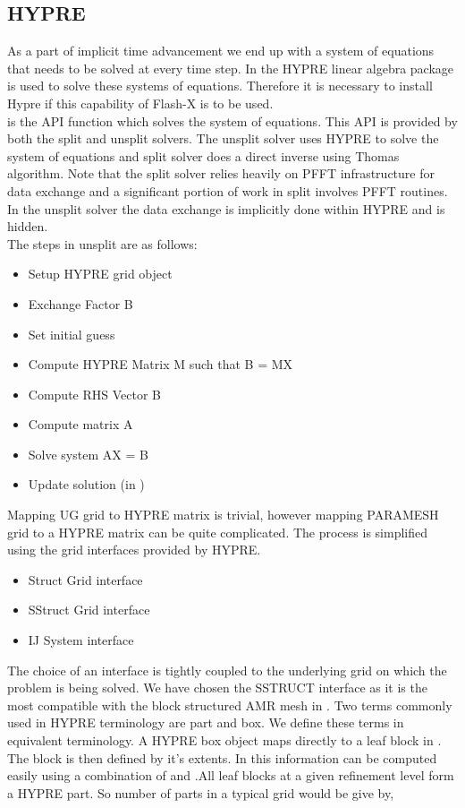 \subsection {HYPRE}
As a part of implicit time advancement we end up with a system of equations that needs to be solved at every time 
step. In \flashx the HYPRE linear algebra package is used to solve
these systems of equations. Therefore it is necessary to install Hypre
if this capability of Flash-X is to be used.\\

 is the API function which solves the system of equations. This API is provided by both
the split and unsplit solvers. The unsplit solver uses HYPRE to solve the system of equations and split solver does
a direct inverse using Thomas algorithm. Note that the split solver relies heavily on PFFT infrastructure
for data exchange and a significant portion of work in split  involves PFFT routines. In the 
unsplit solver the data exchange is implicitly done within HYPRE and is hidden. \\

The steps in unsplit  are as follows:
\begin{itemize}
\item {Setup HYPRE grid object}
\item {Exchange Factor B}
\item {Set initial guess}
\item {Compute HYPRE Matrix M such that B = MX}
\item {Compute RHS Vector B}
\item {Compute matrix A}
\item {Solve system AX = B}
\item {Update solution (in \flashx)} \\
\end{itemize} 

Mapping UG grid to HYPRE matrix is trivial, however mapping PARAMESH grid to a HYPRE matrix can be quite complicated. The 
process is simplified using the grid interfaces provided by HYPRE.
\begin{itemize}
\item {Struct Grid interface}
\item {SStruct Grid interface}
\item {IJ System interface}
\end{itemize} 

The choice of an interface is tightly coupled to the underlying grid on which the problem is being solved. We have chosen the SSTRUCT 
interface as it is the most compatible with the block structured AMR mesh in \flashx. Two terms commonly used in HYPRE terminology 
are part and box. We define these terms in equivalent \flashx terminology. A HYPRE box object maps directly to a leaf block in \flashx. 
The block is then defined by it's extents. In \flashx this information can be computed easily using a combination of  
and .All leaf blocks at a given refinement level form a HYPRE part. So number of parts in a typical 
\flashx grid would be give by,  \\

